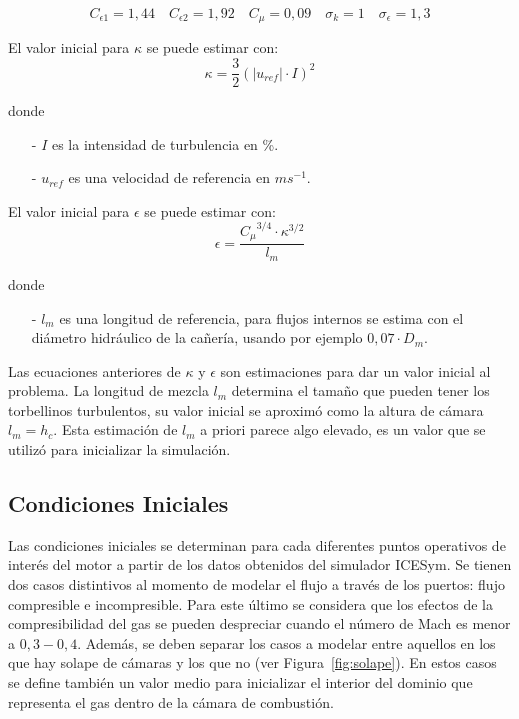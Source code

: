 \begin{equation}
  C_{\epsilon 1}=1,44
  \quad
  C_{\epsilon 2}=1,92
  \quad
  C_{\mu}=0,09
  \quad
  \sigma_{k}=1
  \quad
  \sigma_{\epsilon}=1,3
\end{equation}

El valor inicial para $\kappa$ se puede estimar con:
\begin{equation}\label{eq:kappa_est}
  \kappa = \frac{3}{2} {\left( |u_{ref}| \cdot I \right)}^{2}
\end{equation}


donde
\begin{itemize}
  \item[-] $I$ es la intensidad de turbulencia en \%.
  \item[-] $u_{ref}$ es una velocidad de referencia en $ms^{-1}$.
\end{itemize}

El valor inicial para $\epsilon$ se puede estimar con:
\begin{equation}\label{eq:epsilon_est}
  \epsilon = \frac{{C_{\mu}}^{3/4} \cdot {\kappa}^{3/2}} {l_{m}}
\end{equation}

donde
\begin{itemize}
 \item[-] $l_{m}$ es una longitud de referencia, para flujos internos se estima
con el diámetro hidráulico de la cañería, usando por ejemplo $0,07 \cdot D_{m}$.
\end{itemize}



Las ecuaciones anteriores de  $\kappa$ y $\epsilon$ son estimaciones para dar un
valor inicial al problema.
%
La longitud de mezcla $l_m$ determina el tamaño que pueden tener los torbellinos
turbulentos, su valor inicial se aproximó como la altura de cámara $l_m = h_c$.
%
Esta estimación de $l_{m}$ a priori parece algo elevado, es un valor que se
utilizó para inicializar la simulación.


\subsection{Condiciones Iniciales}\label{cap2:cond_iniciales}
%
Las condiciones iniciales se determinan para cada diferentes puntos operativos
de interés del motor a partir de los datos obtenidos del simulador ICESym.
%
Se tienen dos casos distintivos al momento de modelar el flujo a través de los
puertos: flujo compresible e incompresible.
%
Para este último se considera que los efectos de la compresibilidad del gas se
pueden despreciar cuando el número de Mach es menor a $0,3-0,4$.
%
Además, se deben separar los casos a modelar entre aquellos en los que hay
solape de cámaras y los que no (ver Figura~\ref{fig:solape}).
%
En estos casos se define también un valor medio para inicializar el interior del
dominio que representa el gas dentro de la cámara de combustión.

